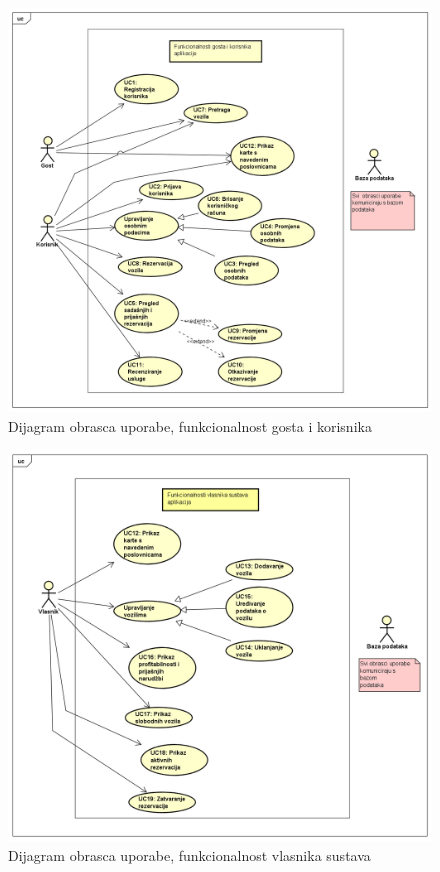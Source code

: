 				\begin{figure}[hp]
                    \centering
                    \includegraphics[width=15cm]{dokumentacija/slike/UseCase Diagram0.png}
                    \caption{Dijagram obrasca uporabe, funkcionalnost gosta i korisnika}
                    \label{fig:useCase-1}
                \end{figure}
				\begin{figure}[hp]
                    \centering
                    \includegraphics[width=15cm]{dokumentacija/slike/UseCaseDiagram1.png}
                    \caption{Dijagram obrasca uporabe, funkcionalnost vlasnika sustava}
                    \label{fig:useCase-1}
                \end{figure}
